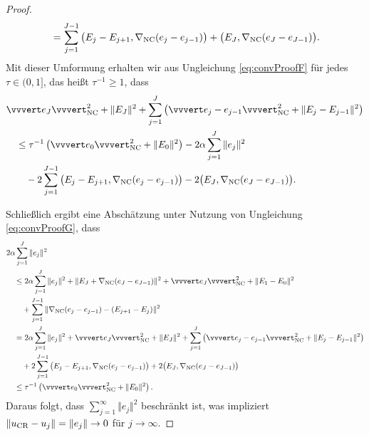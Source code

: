 \begin{proof}
\begin{align*}
    &\quad = 
    \sum_{j=1}^{J-1} 
    \big(E_j-E_{j+1},\nabla_\textup{NC}(e_j-e_{j-1})\big)
    +\big(E_J,\nabla_\textup{NC}(e_J-e_{J-1})\big).
  \end{align*}
  Mit dieser Umformung erhalten wir aus Ungleichung \eqref{eq:convProofF} für
  jedes $\tau\in(0,1]$, das heißt $\tau^{-1}\geq 1$, dass
  \begin{equation}
    \label{eq:convProofG}
    \begin{aligned}
      &\vvvert e_J \vvvert^2_\nc +\Vert E_J \Vert^2 
      +\sum_{j=1}^J\left(\vvvert e_j-e_{j-1} \vvvert_\nc^2 + 
      \Vert E_j-E_{j-1}\Vert^2\right) \\
      &\quad \leq 
      \tau^{-1}\left(\vvvert e_0 \vvvert_\nc^2 + \Vert E_0 \Vert^2 \right)
      -2\alpha\sum_{j=1}^J \Vert e_j\Vert^2 \\
      &\quad\quad
      -2 \sum_{j=1}^{J-1} \big(E_j-E_{j+1},\gradnc(e_j-e_{j-1})\big)
      -2\big(E_J,\gradnc(e_J-e_{J-1})\big).
    \end{aligned}
  \end{equation}

  Schließlich ergibt eine Abschätzung unter Nutzung von Ungleichung
  \eqref{eq:convProofG}, dass
  \begin{align*}
    &2\alpha\sum_{j=1}^J\Vert e_j\Vert^2 \\
    &\quad\leq
    2\alpha\sum_{j=1}^J\Vert e_j\Vert^2
    +\Vert E_J + \gradnc(e_J-e_{J-1}) \Vert^2 
    + \vvvert e_J \vvvert^2_\nc 
    + \Vert E_1 - E_0 \Vert^2 \\
    &\quad\quad
    + \sum_{j=1}^{J-1}  
      \Vert \gradnc(e_j-e_{j-1}) - (E_{j+1} - E_j ) \Vert^2 \\
    & \quad= 
    2\alpha\sum_{j=1}^J\Vert e_j\Vert^2
    +\vvvert e_J \vvvert^2_\nc + \Vert E_J \Vert^2 
    + \sum_{j=1}^J \left( \vvvert e_j-e_{j-1} \vvvert^2_\nc
    + \Vert E_j - E_{j-1} \Vert^2 \right)\\
    &\quad\quad
    + 2\sum_{j=1}^{J-1}\big(E_j-E_{j+1},\gradnc(e_j-e_{j-1})\big)
    + 2\big(E_{J},\gradnc(e_J-e_{J-1})\big) \\
    &\quad\leq
    \tau^{-1}\left(\vvvert e_0\vvvert^2_\nc + \Vert E_0\Vert^2\right).
  \end{align*}
  Daraus folgt, dass $\sum_{j=1}^\infty \Vert e_j\Vert^2$ beschränkt
  ist, was impliziert $\Vert u_\textup{CR}-u_j\Vert=\Vert e_j\Vert\rightarrow 0$ für
  $j\rightarrow \infty$.
\end{proof}


